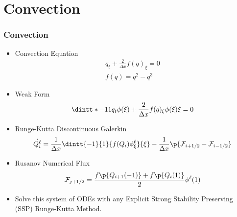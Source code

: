 \documentclass[10pt]{beamer}
\begin{document}
  \section{Convection}
    \begin{frame}
      \frametitle{Convection}
      \begin{itemize}
        \item Convection Equation
          \begin{gather*}
            q_t + \frac{2}{\Delta x} f(q)_\xi = 0 \\
            f(q) = q^2 - q^3
          \end{gather*}

        \item Weak Form
          \[
            \dintt*{-1}{1}{q_t \phi(\xi) + \frac{2}{\Delta x}f(q)_\xi \phi(\xi)}{\xi} = 0
          \]

        \item Runge-Kutta Discontinuous Galerkin
          \[
            \dot{Q_i^{\ell}} = \frac{1}{\Delta x}\dintt{-1}{1}{f(Q_i)\phi_{\xi}^{\ell}}{\xi} - \frac{1}{\Delta x} \p{\mcF_{i + 1/2} - \mcF_{i - 1/2}}
          \]

        \item Rusanov Numerical Flux
          \[
            \mcF_{j+1/2} = \frac{f\p{Q_{i+1}(-1)} + f\p{Q_{i}(1)}}{2} \phi^{\ell}(1)
          \]

        \item Solve this system of ODEs with any Explicit Strong Stability Preserving (SSP) Runge-Kutta Method.
      \end{itemize}
    \end{frame}
\end{document}
